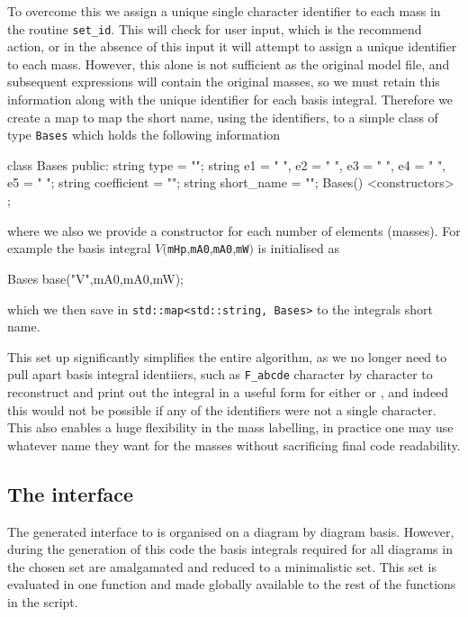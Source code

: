 To overcome this we assign a unique single character identifier to each mass in the routine \lstinline{set_id}.  This will check for user input, which is the recommend action, or in the absence of this input it will attempt to assign a unique identifier to each mass.  However, this alone is not sufficient as the original \feynarts model file, and subsequent expressions will contain the original masses, so we must retain this information along with the unique identifier for each basis integral.  Therefore we create a \CC map to map the short name, using the identifiers, to a simple class of type \lstinline{Bases} which holds the following information
\begin{lstcpp}
class Bases
{
public:
	string type = "";
	string e1 = " ", e2 = " ", e3 = " ", e4 = " ", e5 = " ";
	string coefficient = "";
	string short_name = "";
	Bases() {}
	<constructors>
};
\end{lstcpp}
where we also we provide a constructor for each number of elements (masses).  For example the basis integral $V($\lstinline{mHp},\lstinline{mA0},\lstinline{mA0},\lstinline{mW}$)$ is initialised as\begin{lstcpp}
Bases base("V",mA0,mA0,mW);
\end{lstcpp}
which we then save in \lstinline{std::map<std::string, Bases>} to the integrals short name.

This set up significantly simplifies the entire algorithm, as we no longer need to pull apart basis integral identiiers, such as \lstinline{F_abcde} character by character to reconstruct and print out the integral in a useful form for either \feyncalc or \tsils, and indeed this would not be possible if any of the identifiers were not a single character.  This also enables a huge flexibility in the mass labelling, in practice one may use whatever name they want for the masses without sacrificing final code readability.



\subsection{The \tsil interface}\label{sec:tsil_interface}

The generated \CC interface to \tsil is organised on a diagram by diagram basis.  However, during the generation of this code the basis integrals required for all diagrams in the chosen set are amalgamated and reduced to a minimalistic set.  This set is evaluated in one function and made globally available to the rest of the functions in the script.

